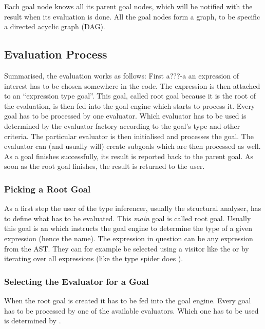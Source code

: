 \documentclass[12pt,halfparskip,DIV11,BCOR10mm]{scrreprt}
\begin{document}
Each goal node knows all its parent goal nodes, which will be notified with the result when its evaluation is done. All the goal nodes form a graph, to be specific a directed acyclic graph (DAG).

\subsection{Evaluation Process}

Summarised, the evaluation works as follows: First a???-a an expression of interest has to be chosen somewhere in the code. The expression is then attached to an ``expression type goal''. This goal, called root goal because it is the root of the evaluation, is then fed into the goal engine which starts to process it. Every goal has to be processed by one evaluator. Which evaluator has to be used is determined by the evaluator factory according to the goal's type and other criteria. The particular evaluator is then initialised and processes the goal. The evaluator can (and usually will) create subgoals which are then processed as well. As a goal finishes successfully, its result is reported back to the parent goal. As soon as the root goal finishes, the result is returned to the user.

\subsubsection{Picking a Root Goal}

As a first step the user of the type inferencer, usually the structural analyser, has to define what has to be evaluated. This \emph{main} goal is called root goal. Usually this goal is an  which instructs the goal engine to determine the type of a given expression (hence the name). The expression in question can be any expression from the AST. They can for example be selected using a visitor like the  or by iterating over all expressions (like the type spider does ).

\subsubsection{Selecting the Evaluator for a Goal}

When the root goal is created it has to be fed into the goal engine. Every goal has to be processed by one of the available evaluators. Which one has to be used is determined by .
\end{document}
